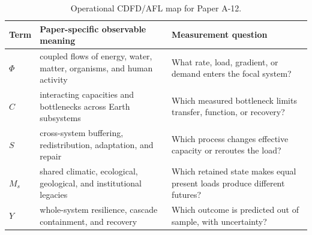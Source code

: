 \documentclass[12pt,a4paper]{article}
\begin{document}
\begin{table}[htbp]
\centering
\small
\caption{Operational CDFD/AFL map for Paper A-12.}
\begin{tabularx}{\textwidth}{|l|X|X|}
\hline
\textbf{Term} & \textbf{Paper-specific observable meaning} & \textbf{Measurement question} \\
\hline
$\Phi$ & coupled flows of energy, water, matter, organisms, and human activity & What rate, load, gradient, or demand enters the focal system? \\
\hline
$C$ & interacting capacities and bottlenecks across Earth subsystems & Which measured bottleneck limits transfer, function, or recovery? \\
\hline
$S$ & cross-system buffering, redistribution, adaptation, and repair & Which process changes effective capacity or reroutes the load? \\
\hline
$M_s$ & shared climatic, ecological, geological, and institutional legacies & Which retained state makes equal present loads produce different futures? \\
\hline
$Y$ & whole-system resilience, cascade containment, and recovery & Which outcome is predicted out of sample, with uncertainty? \\
\hline
\end{tabularx}
\end{table}
\end{document}
